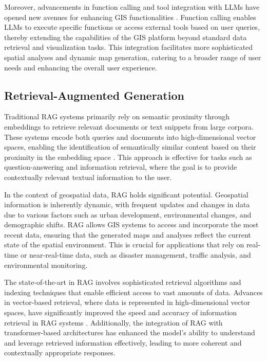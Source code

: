 Moreover, advancements in function calling and tool integration with LLMs have opened new avenues for enhancing GIS functionalities \cite{qu2024toolsurvey}. Function calling enables LLMs to execute specific functions or access external tools based on user queries, thereby extending the capabilities of the GIS platform beyond standard data retrieval and visualization tasks. This integration facilitates more sophisticated spatial analyses and dynamic map generation, catering to a broader range of user needs and enhancing the overall user experience.

\subsection{Retrieval-Augmented Generation}


Traditional RAG systems primarily rely on semantic proximity through embeddings to retrieve relevant documents or text snippets from large corpora. These systems encode both queries and documents into high-dimensional vector spaces, enabling the identification of semantically similar content based on their proximity in the embedding space \cite{gao_retrieval-augmented_2024}. This approach is effective for tasks such as question-answering and information retrieval, where the goal is to provide contextually relevant textual information to the user. 

In the context of geospatial data, RAG holds significant potential. Geospatial information is inherently dynamic, with frequent updates and changes in data due to various factors such as urban development, environmental changes, and demographic shifts. RAG allows GIS systems to access and incorporate the most recent data, ensuring that the generated maps and analyses reflect the current state of the spatial environment. This is crucial for applications that rely on real-time or near-real-time data, such as disaster management, traffic analysis, and environmental monitoring.

The state-of-the-art in RAG involves sophisticated retrieval algorithms and indexing techniques that enable efficient access to vast amounts of data. Advances in vector-based retrieval, where data is represented in high-dimensional vector spaces, have significantly improved the speed and accuracy of information retrieval in RAG systems \cite{gao_retrieval-augmented_2024}. Additionally, the integration of RAG with transformer-based architectures has enhanced the model's ability to understand and leverage retrieved information effectively, leading to more coherent and contextually appropriate responses.

